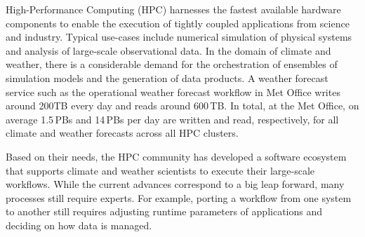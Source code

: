 \documentclass{superfri}
\newcommand{\jk}[1]{\todo[inline]{JK: #1}}
\newcommand{\lr}[1]{\textcolor{cyan}{LR: #1}}
\newcommand{\bnl}[1]{\textcolor{green}{BNL: #1}}
\begin{document}
High-Performance Computing (HPC) harnesses the fastest available hardware components to enable the execution of tightly coupled applications from science and industry.
Typical use-cases include numerical simulation of physical systems and analysis of large-scale observational data.
In the domain of climate and weather, there is a considerable demand for the orchestration of ensembles of simulation models and the generation of data products.
A weather forecast service such as the operational weather forecast workflow in Met Office writes around 200TB every day and reads around 600\,TB.
In total, at the Met Office, on average 1.5\,PBs and 14\,PBs per day are written and read, respectively, for all climate and weather forecasts across all HPC clusters.

Based on their needs, the HPC community has developed a software ecosystem that supports climate and weather scientists to execute their large-scale workflows.
While the current advances correspond to a big leap forward, many processes still require experts.
For example, porting a workflow from one system to another still requires adjusting runtime parameters of applications and deciding on how data is managed.

\end{document}
